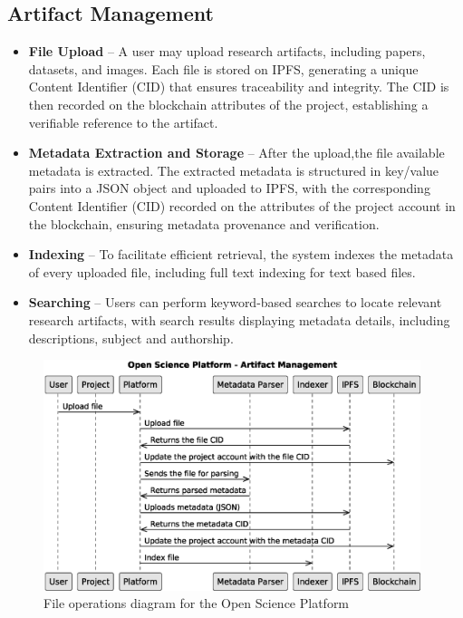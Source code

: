 \documentclass{article}
\begin{document}
\subsection{Artifact Management}

\begin{itemize}
      \item \textbf{File Upload} – A user may upload research artifacts, including papers, datasets, and images. Each file is stored on IPFS, generating a unique Content Identifier (CID) that ensures traceability and integrity. The CID is then recorded on the blockchain attributes of the project, establishing a verifiable reference to the artifact.

      \item \textbf{Metadata Extraction and Storage} – After the upload,the file available metadata is extracted. The extracted metadata is structured in key/value pairs into a JSON object and uploaded to IPFS, with the corresponding Content Identifier (CID) recorded on the attributes of the project account in the blockchain, ensuring metadata provenance and verification.

      \item \textbf{Indexing} – To facilitate efficient retrieval, the system indexes the metadata of every uploaded file, including full text indexing for text based files.

      \item \textbf{Searching} – Users can perform keyword-based searches to locate relevant research artifacts, with search results displaying metadata details, including descriptions, subject and authorship.
\end{itemize}


\begin{figure}[htbp]
      \centering
      \includegraphics[width=0.98\textwidth, keepaspectratio]{c4_platform_operations_2}
      \caption{File operations diagram for the Open Science Platform}
      \label{fig:c4_file_operations_diagram}
\end{figure}
\end{document}
